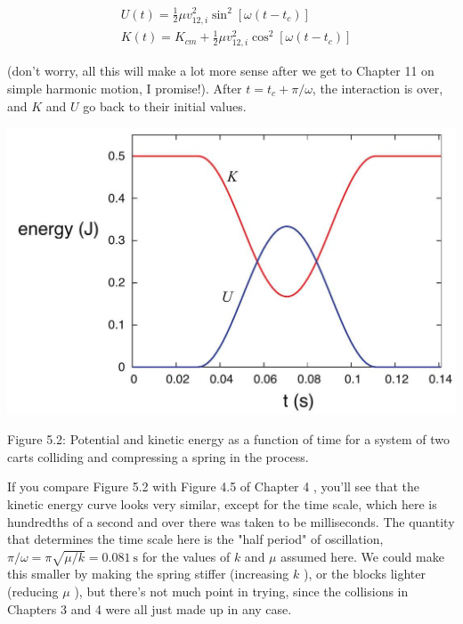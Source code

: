 \documentclass[10pt]{article}
\begin{document}
\begin{align*}
& U(t)=\frac{1}{2} \mu v_{12, i}^{2} \sin ^{2}\left[\omega\left(t-t_{c}\right)\right] \\
& K(t)=K_{c m}+\frac{1}{2} \mu v_{12, i}^{2} \cos ^{2}\left[\omega\left(t-t_{c}\right)\right] \tag{5.7}
\end{align*}


(don't worry, all this will make a lot more sense after we get to Chapter 11 on simple harmonic motion, I promise!). After $t=t_{c}+\pi / \omega$, the interaction is over, and $K$ and $U$ go back to their initial values.

\begin{center}
\includegraphics[max width=\textwidth]{2024_09_14_9969b06773f10b6936e8g-111}
\end{center}

Figure 5.2: Potential and kinetic energy as a function of time for a system of two carts colliding and compressing a spring in the process.

If you compare Figure 5.2 with Figure 4.5 of Chapter 4 , you'll see that the kinetic energy curve looks very similar, except for the time scale, which here is hundredths of a second and over there was taken to be milliseconds. The quantity that determines the time scale here is the "half period" of oscillation, $\pi / \omega=\pi \sqrt{\mu / k}=0.081 \mathrm{~s}$ for the values of $k$ and $\mu$ assumed here. We could make this smaller by making the spring stiffer (increasing $k$ ), or the blocks lighter (reducing $\mu$ ), but there's not much point in trying, since the collisions in Chapters 3 and 4 were all just made up in any case.
\end{document}
